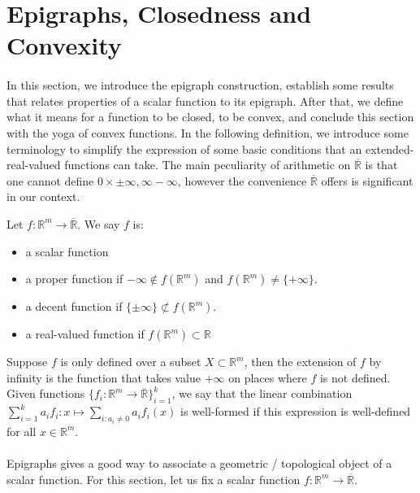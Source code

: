 \section{Epigraphs, Closedness and Convexity}
\label{sect:021}

\paragraph{}In this section, we introduce the epigraph construction, establish some results that relates properties of a scalar function to its epigraph. After that, we define what it means for a function to be closed, to be convex, and conclude this section with the yoga of convex functions. In the following definition, we introduce some terminology to simplify the expression of some basic conditions that an extended-real-valued functions can take. The main peculiarity of arithmetic on $\overline{\mathbb{R}}$ is that one cannot define $0\times\pm\infty,\infty-\infty$, however the convenience $\overline{\mathbb{R}}$ offers is significant in our context.

\begin{defn}
	\label{defn:021-functions-def}
	Let $f:\mathbb{R}^m\to \overline{\mathbb{R}}$. We say $f$ is:
	\begin{itemize}
		\item a scalar function
		\item a proper function if $-\infty\notin f(\mathbb{R}^m)$ and $f(\mathbb{R}^m)\neq \{+\infty\}$.
		\item a decent function if $\{\pm\infty\}\nsubset f(\mathbb{R}^m)$.
		\item a real-valued function if $f(\mathbb{R}^m)\subset \mathbb{R}$
	\end{itemize}
	Suppose $f$ is only defined over a subset $X\subset \mathbb{R}^m$, then the extension of $f$ by infinity is the function that takes value $+\infty$ on places where $f$ is not defined. Given functions $\{f_i:\mathbb{R}^m\to \overline{\mathbb{R}}\}_{i=1}^k$, we say that the linear combination $\sum_{i=1}^ka_if_i:x\mapsto\sum_{i:a_i\neq 0}a_if_i(x)$ is well-formed if this expression is well-defined for all $x\in \mathbb{R}^m$.
\end{defn}

\paragraph{}Epigraphs gives a good way to associate a geometric / topological object of a scalar function. For this section, let us fix a scalar function $f:\mathbb{R}^m\to \overline{\mathbb{R}}$.


